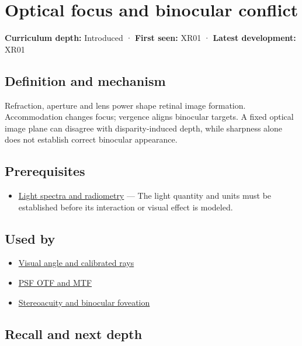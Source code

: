 \hypertarget{appendix-f90cee1be7a4}{}\label{referencestart:appendix-f90cee1be7a4}
\section{Optical focus and binocular conflict}\label{appendix-f90cee1be7a4-optical-focus-and-binocular-conflict}

\textbf{Curriculum depth:} Introduced · \textbf{First seen:} XR01 · \textbf{Latest development:} XR01

\subsection{Definition and mechanism}\label{appendix-f90cee1be7a4-definition-and-mechanism}

Refraction, aperture and lens power shape retinal image formation. Accommodation changes focus; vergence aligns binocular targets. A fixed optical image plane can disagree with disparity-induced depth, while sharpness alone does not establish correct binocular appearance.

\subsection{Prerequisites}\label{appendix-f90cee1be7a4-prerequisites}

\begin{itemize}
\tightlist
\item
  \hyperref[appendix-215c2570199b]{Light spectra and radiometry} --- The light quantity and units must be established before its interaction or visual effect is modeled.
\end{itemize}

\subsection{Used by}\label{appendix-f90cee1be7a4-used-by}

\begin{itemize}
\tightlist
\item
  \hyperref[appendix-7d356c396d1a]{Visual angle and calibrated rays}
\item
  \hyperref[appendix-8b76b0efd27f]{PSF OTF and MTF}
\item
  \hyperref[appendix-8dc848f14052]{Stereoacuity and binocular foveation}
\end{itemize}

\subsection{Recall and next depth}\label{appendix-f90cee1be7a4-recall-and-next-depth}

